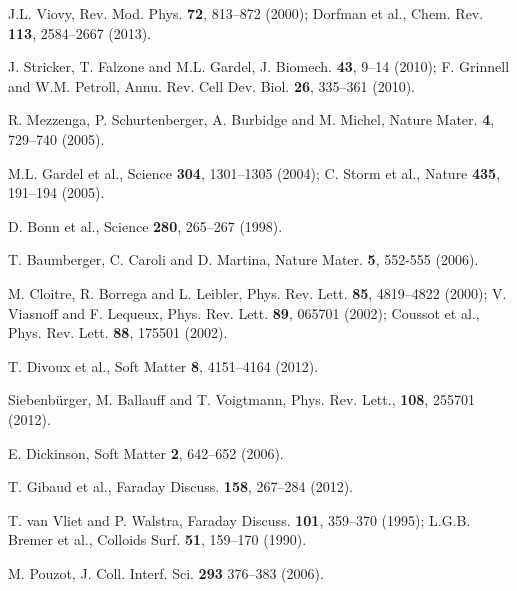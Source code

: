\documentclass[twocolumn,superscriptaddress,showpacs,preprintnumbers,amsmath,amssymb,prl]{revtex4}
\begin{document}
\begin{thebibliography}{}

 J.L. Viovy, Rev. Mod. Phys. {\bf 72}, 813--872 (2000); Dorfman et al., Chem. Rev. {\bf 113}, 2584--2667 (2013).

 J. Stricker, T. Falzone and M.L. Gardel, J. Biomech. {\bf 43},  9--14 (2010); F. Grinnell and W.M. Petroll, Annu. Rev. Cell Dev. Biol. {\bf 26}, 335--361 (2010).

 R. Mezzenga, P. Schurtenberger, A. Burbidge and M. Michel, Nature Mater.  {\bf 4}, 729--740 (2005).

 M.L. Gardel et al., Science {\bf 304}, 1301--1305 (2004); C. Storm et al., Nature {\bf 435}, 191--194 (2005).

 D. Bonn et al., Science {\bf 280}, 265--267 (1998).

 T. Baumberger, C. Caroli and D. Martina, Nature Mater. {\bf 5}, 552-555 (2006).



 M. Cloitre, R. Borrega and L. Leibler, Phys. Rev. Lett. {\bf 85}, 4819--4822 (2000); V. Viasnoff and F. Lequeux, Phys. Rev. Lett. {\bf 89}, 065701 (2002); Coussot et al., Phys. Rev. Lett. {\bf 88}, 175501 (2002).

 T. Divoux et al., Soft Matter {\bf 8}, 4151--4164 (2012).

 Siebenb\"urger, M. Ballauff and T. Voigtmann, Phys. Rev.
Lett., {\bf 108}, 255701 (2012).

 E. Dickinson, Soft Matter {\bf 2}, 642--652 (2006).

 T. Gibaud et al., Faraday Discuss. {\bf 158}, 267--284 (2012).


 T. van Vliet and P. Walstra, Faraday Discuss. {\bf 101}, 359--370 (1995); L.G.B. Bremer et al., Colloids Surf. {\bf 51}, 159--170 (1990).

 M. Pouzot, J. Coll. Interf. Sci. {\bf 293} 376--383 (2006).


\end{thebibliography}
\end{document}
